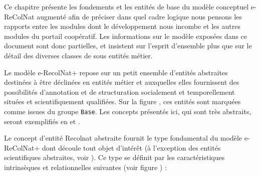 \startchapter[title={Les entités de base du modèle e-RecolNat+},reference=model:base]

\startsection[title={Introduction}]

Ce chapitre présente les fondements et les entités de base du modèle conceptuel e-ReColNat augmenté afin de préciser dans quel cadre logique nous pensons les rapports entre les modules dont le développement nous incombe et les autres modules du portail coopératif.
Les informations sur le modèle exposées dans ce document sont donc partielles, et insistent sur l'esprit d'ensemble plus que sur le détail des diverses classes de sous entités métier.

Le modèle e-RecolNat+ repose sur un petit ensemble d'entités abstraites destinées à être déclinées en entités métier et auxquelles elles fournissent des possibilités d'annotation et de structuration socialement et temporellement situées et scientifiquement qualifiées.
Sur la figure , ces entités sont marquées comme issues du groupe {\tt Base}.
Les concepts présentés ici, qui sont très abstraits, seront exemplifiés en  et .


\stopsection
\startsection[title={Entité abstraite Recolnat (EAR)}]

Le concept d'entité Recolnat abstraite fournit le type fondamental du modèle e-ReColNat+ dont découle tout objet d'intérêt (à l'exception des entités scientifiques abstraites, voir ).
Ce type se définit par les caractéristiques intrinsèques et relationnelles suivantes (voir figure ) :

